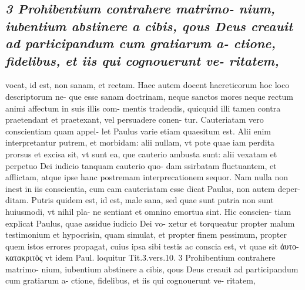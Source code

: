 \documentclass{article}
\begin{document}
\begin{pages}
\subsection*{\textit{3 Prohibentium contrahere matrimo- nium, iubentium abstinere a cibis, qous Deus creauit ad participandum cum gratiarum a- ctione, fidelibus, et iis qui cognouerunt ve- ritatem,}}vocat, id est, non sanam, et rectam. Haec autem docent haereticorum hoc loco descriptorum ne- que esse sanam doctrinam, neque sanctos mores neque rectum animi affectum in suis illis com- mentis tradendis, quicquid illi tamen contra praetendant et praetexant, vel persuadere conen- tur. Cauteriatam vero conscientiam quam appel- let Paulus varie etiam quaesitum est. Alii enim interpretantur putrem, et morbidam: alii nullam, vt pote quae iam perdita prorsus et excisa sit, vt sunt ea, que cauterio ambusta sunt: alii vexatam et perpetuo Dei iudicio tanquam cauterio quo- dam ssirbatam fluctuantem, et afflictam, atque ipse hanc postremam interprecationem sequor. Nam nulla non inest in iis conscientia, cum eam cauteriatam esse dicat Paulus, non autem deper- ditam. Putris quidem est, id est, male sana, sed quae sunt putria non sunt huiusmodi, vt nihil pla- ne sentiant et omnino emortua sint. Hic conscien- tiam explicat Paulus, quae assidue iudicio Dei vo- xetur et torqueatur propter malum testimonium et hypocrisin, quam simulat, et propter finem pessimum, propter quem istos errores propagat, cuius ipsa sibi testis ac conscia est, vt quae sit ἀυτο- κατακριτὸς vt idem Paul. loquitur Tit.3.vers.10. 3 Prohibentium contrahere matrimo- nium, iubentium abstinere a cibis, qous Deus creauit ad participandum cum gratiarum a- ctione, fidelibus, et iis qui cognouerunt ve- ritatem,  \pend

\end{pages}
\end{document}
